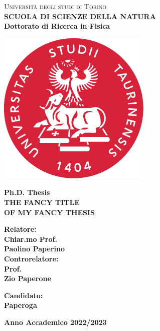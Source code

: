 \begin{titlepage}
\begin{center}
{{\Large{\textsc{Universit\`a degli studi di Torino \\}}}} \vspace{5mm} {\small{\bf SCUOLA DI SCIENZE DELLA NATURA\\ \vspace{3mm}
Dottorato di Ricerca in Fisica}}
\vspace{5mm}
\end{center}
\begin{center}
\includegraphics[scale=.3]{pictures/logo_social_unito.png}
\end{center}
\begin{center}
\vspace{5mm}
{\large{\bf Ph.D. Thesis\\}}
\vspace{5mm}
{\LARGE{\bf THE FANCY TITLE\\ OF MY FANCY THESIS\\}}
\end{center}
\vspace{20mm}
\par
\noindent
\begin{minipage}[t]{0.47\textwidth}
{\large{\bf Relatore:\\
Chiar.mo Prof.\\
Paolino Paperino}}
\vspace{8mm}
{\large{\bf \\ Controrelatore:\\
Prof.\\
Zio Paperone}}
\end{minipage}
\hfill
\begin{minipage}[t]{0.47\textwidth}\raggedleft
\vspace{20mm}
{\large{\bf Candidato:\\
Paperoga}}
\end{minipage}
\vspace{10mm}
\begin{center}
{\large{\bf 
Anno Accademico 2022/2023}}
\end{center}

\end{titlepage}
